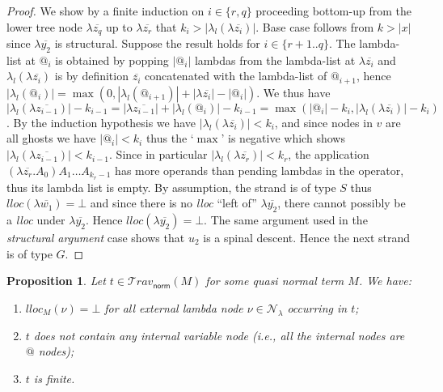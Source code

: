 \documentclass[xchauthor,chkrefs,GCNS,amsmath,amsthm,rotating,leaveRGB]{tcsg}
\theoremstyle{plain}
\newtheorem{proposition}[theorem]{Proposition}
\theoremstyle{definition}
\newcommand\travset{\mathcal{T}\!rav}
\newcommand{\Nodes}{\mathcal{N}}
\newcommand{\NodesLmd}{\Nodes_\lambda}
\newcommand{\normalizing}{\mathsf{norm}}
\newcommand{\travsetnorm}{\travset_{\normalizing}}
\begin{document}
\begin{proof}
We show by a finite induction on $i \in \{r, q\}$ proceeding bottom-up from
the lower tree node $\lambda \overline{z_{q}}$ up to $\lambda
\overline{z_{r}}$ that $k_{i}>|\lambda _{l}(\lambda \overline{z_{i}})|$. Base
case follows from $k>|x|$ since $\lambda \overline{y_{2}}$ is structural.
Suppose the result holds for $i\in \{r+1..q\}$. The lambda-list at $@_{i}$ is
obtained by popping $|@_{i}|$ lambdas from the lambda-list at $\lambda
\overline{z_{i}}$ and $\lambda _{l}(\lambda \overline{z_{i}})$ is by
definition $\overline{z_{i}}$ concatenated with the lambda-list of $@_{i+1}$,
hence $|\lambda _{l}(@_{i})| = \max ( 0, |\lambda _{l}(@_{i+1})| + |\lambda
\overline{z_{i}}| - |@_{i}| )$. We thus have $|\lambda _{l}(\lambda
\overline{z_{i-1}})| - k_{i-1} = |\lambda \overline{z_{i-1}}| +|\lambda
_{l}(@_{i})| - k_{i-1} = \max (  |@_{i}|- k_{i}, |\lambda _{l}(\lambda
\overline{z_{i}})| - k_{i} )$. By the induction hypothesis we have $|\lambda
_{l}(\lambda \overline{z_{i}})| < k_{i}$, and since nodes in $v$ are all
ghosts we have $|@_{i}|< k_{i}$ thus the `$\max $' is negative which shows
$|\lambda _{l}(\lambda \overline{z_{i-1}})| < k_{i-1}$. Since in particular
$|\lambda _{l}(\lambda \overline{z_{r}})| < k_{r}$, the application $(\lambda
\overline{z_{r}} . A_{0}) A_{1} \ldots A_{k_{r}-1}$ has more operands than
pending lambdas in the operator, thus its lambda list is empty. By
assumption, the strand is of type $S$ thus $lloc(\lambda
\overline{w_{1}})=\bot $ and since there is no \emph{lloc} ``left of''
$\lambda \overline{y_{2}}$, there cannot possibly be a \emph{lloc} under
$\lambda \overline{y_{2}}$. Hence $lloc(\lambda \overline{y_{2}}) =\bot $.
The same argument used in the \emph{structural argument} case shows that
 $u_{2}$ is a spinal descent. Hence the next strand is of type $G$.
\end{proof}

\begin{proposition}\label{prop:qnf_traversals_are_finite}
Let $t \in \travsetnorm (M)$ for some \emph{quasi normal} term $M$. We have:
%
\begin{enumerate}[\textit{(a)}]
\item[\textit{(a)}] $lloc_{M}(\nu ) = \bot $ for all external lambda node $\nu \in
    \NodesLmd $ occurring in $t$;
\item[\textit{(b)}] $t$ does not contain any internal variable node (\textit{i.e.},
    all the internal nodes are $@$ nodes);
\item[\textit{(c)}] $t$ is finite.
\end{enumerate}
\end{proposition}
\end{document}
